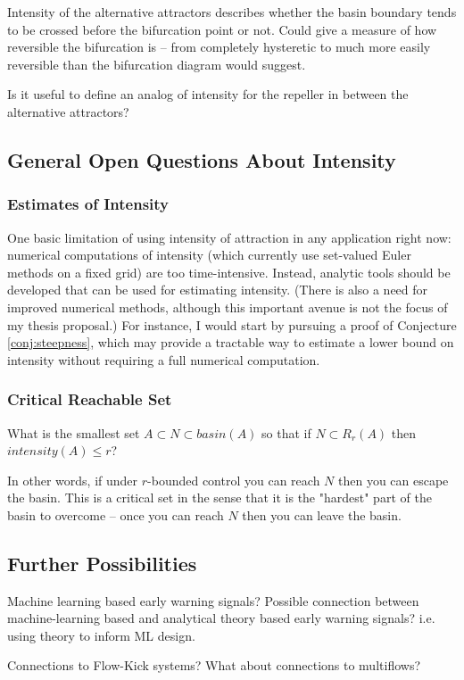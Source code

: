Intensity of the alternative attractors describes whether the basin boundary tends to be crossed before the bifurcation point or not. 
%
Could give a measure of how reversible the bifurcation is -- from completely hysteretic to much more easily reversible than the bifurcation diagram would suggest. 

Is it useful to define an analog of intensity for the repeller in between the alternative attractors?

\subsection{General Open Questions About Intensity}

\subsubsection{Estimates of Intensity}
One basic limitation of using intensity of attraction in any application right now: numerical computations of intensity (which currently use set-valued Euler methods on a fixed grid) are too time-intensive. Instead, analytic tools should be developed that can be used for estimating intensity. (There is also a need for improved numerical methods, although this important avenue is not the focus of my thesis proposal.) For instance, I would start by pursuing a proof of Conjecture \ref{conj:steepness}, which may provide a tractable way to estimate a lower bound on intensity without requiring a full numerical computation. 

\subsubsection{Critical Reachable Set}

What is the smallest set $A \subset N \subset basin(A)$ so that if $N \subset R_r(A)$ then $intensity(A) \leq r$?

In other words, if under $r$-bounded control you can reach $N$ then you can escape the basin. This is a critical set in the sense that it is the "hardest" part of the basin to overcome -- once you can reach $N$ then you can leave the basin. 

\subsection{Further Possibilities}

Machine learning based early warning signals? Possible connection between machine-learning based and analytical theory based early warning signals? i.e. using theory to inform ML design. 


Connections to Flow-Kick systems? What about connections to multiflows?

